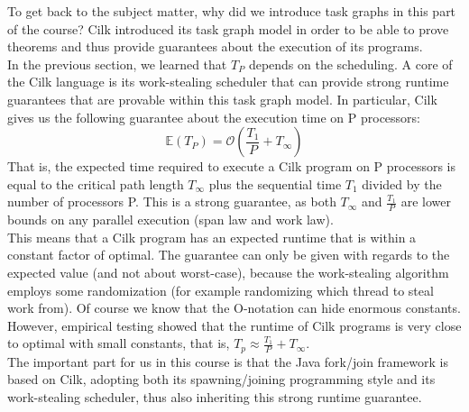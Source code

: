 \documentclass[main.tex]{subfiles}
\begin{document}
To get back to the subject matter, why did we introduce task graphs in this part of the course? Cilk introduced its task graph model in order to be able to prove theorems and thus provide guarantees about the execution of its programs.\\
In the previous section, we learned that \(T_{P}\) depends on the scheduling. A core of the Cilk language is its work-stealing scheduler that can provide strong runtime guarantees that are provable within this task graph model. In particular, Cilk gives us the following guarantee about the execution time on P processors:
$$\mathbb{E}(T_{P})=\mathcal{O}\left(\frac{T_{1}}{P} + T_{\infty}\right)$$
\noindent That is, the expected time required to execute a Cilk program on P processors is equal to the critical path length \(T_{\infty}\) plus the sequential time \(T_{1}\) divided by the number of processors P. This is a strong guarantee, as both \(T_{\infty}\) and \(\frac{T_{1}}{P}\) are lower bounds on any parallel execution (span law and work law).\\
This means that a Cilk program has an expected runtime that is within a constant factor of optimal. The guarantee can only be given with regards to the expected value (and not about worst-case), because the work-stealing algorithm employs some randomization (for example randomizing which thread to steal work from). Of course we know that the O-notation can hide enormous constants. However, empirical testing showed that the runtime of Cilk programs is very close to optimal with small constants, that is, \(T_{p}\approx \frac{T_{1}}{P}+T_{\infty}\).\\
The important part for us in this course is that the Java fork/join framework is based on Cilk, adopting both its spawning/joining programming style and its work-stealing scheduler, thus also inheriting this strong runtime guarantee.
\end{document}
